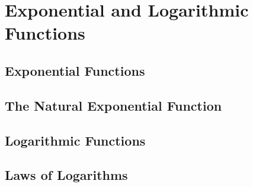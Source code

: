 \documentclass[openright]{memoir}
\begin{document}
\blindtext {}

\chapter{Exponential and Logarithmic Functions}
\completechapterpage{\blindtext[1]}

\section{Exponential Functions}

\blindmathpaper

\section{The Natural Exponential Function}


\section{Logarithmic Functions}


\section{Laws of Logarithms}

\Blindtext
\end{document}
